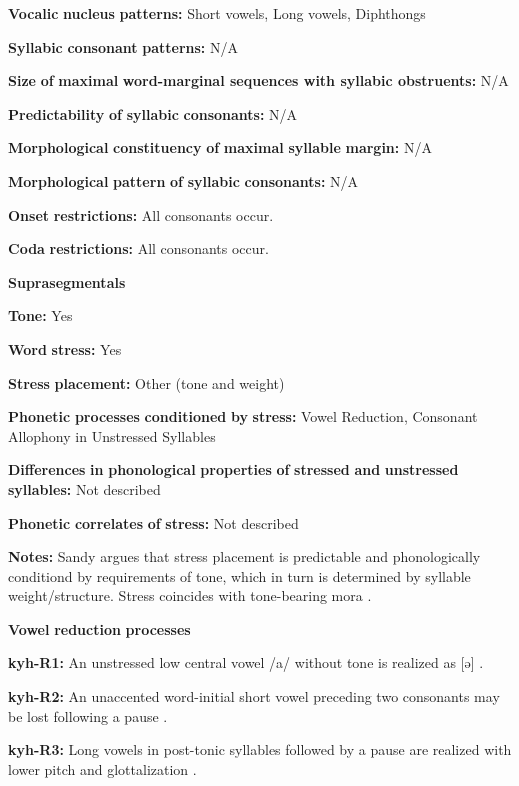 \begin{styleBody}
\textbf{Vocalic} \textbf{nucleus} \textbf{patterns:} Short vowels, Long vowels, Diphthongs

\textbf{Syllabic} \textbf{consonant} \textbf{patterns:} N/A

\textbf{Size} \textbf{of} \textbf{maximal} \textbf{word{}-marginal sequences with syllabic obstruents:} N/A

\textbf{Predictability} \textbf{of} \textbf{syllabic} \textbf{consonants:} N/A

\textbf{Morphological} \textbf{constituency} \textbf{of} \textbf{maximal} \textbf{syllable} \textbf{margin:} N/A

\textbf{Morphological} \textbf{pattern} \textbf{of} \textbf{syllabic} \textbf{consonants:} N/A

\textbf{Onset} \textbf{restrictions:} All consonants occur.

\textbf{Coda} \textbf{restrictions:} All consonants occur.

\textbf{Suprasegmentals}

\textbf{Tone:} Yes

\textbf{Word} \textbf{stress:} Yes

\textbf{Stress} \textbf{placement:} Other (tone and weight)

\textbf{Phonetic} \textbf{processes} \textbf{conditioned} \textbf{by} \textbf{stress:} Vowel Reduction, Consonant Allophony in Unstressed Syllables

\textbf{Differences} \textbf{in} \textbf{phonological} \textbf{properties} \textbf{of} \textbf{stressed} \textbf{and} \textbf{unstressed} \textbf{syllables:} Not described

\textbf{Phonetic} \textbf{correlates} \textbf{of} \textbf{stress:} Not described

\textbf{Notes:} Sandy argues that stress placement is predictable and phonologically conditiond by requirements of tone, which in turn is determined by syllable weight/structure. Stress coincides with tone-bearing mora \citep[40]{Sandy2014}.

\textbf{Vowel} \textbf{reduction} \textbf{processes}

\textbf{kyh-R1:} An unstressed low central vowel /a/ without tone is realized as [ə] \citep[11]{Bright1957}.

\textbf{kyh-R2:} An unaccented word-initial short vowel preceding two consonants may be lost following a pause \citep[53]{Bright1957}.

\textbf{kyh-R3:} Long vowels in post-tonic syllables followed by a pause are realized with lower pitch and glottalization \citep[13]{Bright1957}.


\end{styleBody}

